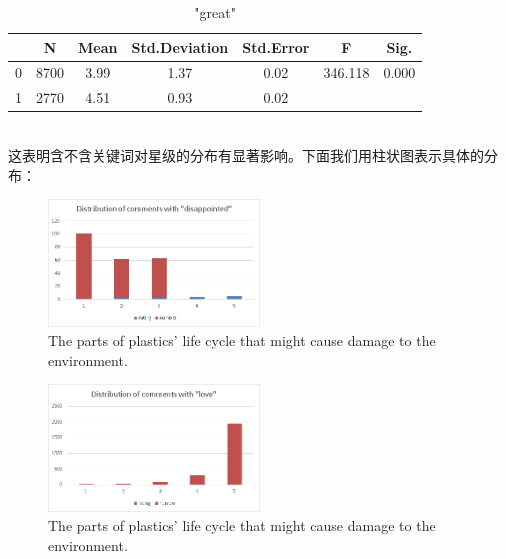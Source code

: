 \documentclass{mcmthesis}
\begin{document}
\begin{table}[htb]
	\center
	\caption{"great"}
	\label{type}
	\begin{tabular}{c|c|c|c|c|c|c}
		\hline
		\textbf{} & \textbf{N} & \textbf{Mean}& \textbf{Std.Deviation}& \textbf{Std.Error}& \textbf{F}& \textbf{Sig.} \\ \hline 
		0        & 8700             & 3.99           & 1.37         & 0.02    & 346.118 & 0.000    \\
		1          & 2770          & 4.51           & 0.93         & 0.02    &  & \\ \hline
	\end{tabular}
\end{table}
\\
这表明含不含关键词对星级的分布有显著影响。下面我们用柱状图表示具体的分布：
\\
\begin{figure}[htb] %
	\centering %
	\includegraphics[width=0.5\textwidth]{figures/dis.png} %
	\caption{The parts of plastics’ life cycle that might cause damage to the environment.} %
	\label{fig4} %
	
\end{figure}
\begin{figure}[htb] %
	\centering %
	\includegraphics[width=0.5\textwidth]{figures/love.png} %
	\caption{The parts of plastics’ life cycle that might cause damage to the environment.} %
	\label{fig4} %
	
\end{figure}
\end{document}
